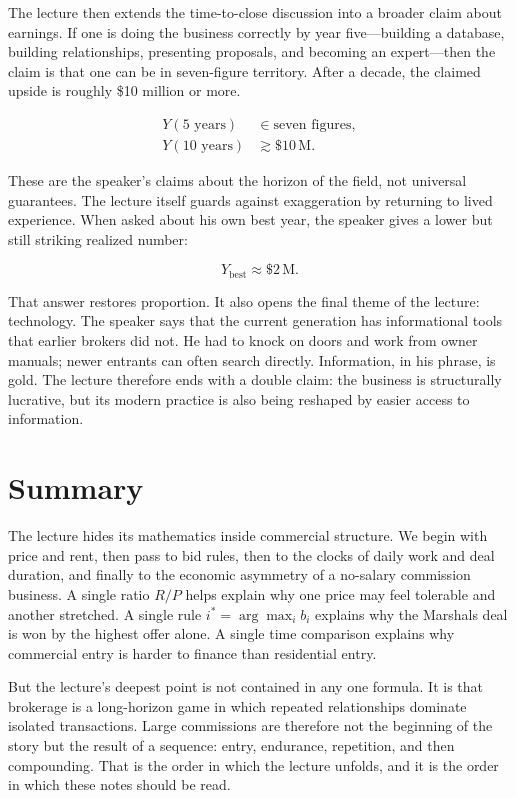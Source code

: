 The lecture then extends the time-to-close discussion into a broader claim about earnings. If one is doing the business correctly by year five---building a database, building relationships, presenting proposals, and becoming an expert---then the claim is that one can be in seven-figure territory. After a decade, the claimed upside is roughly \$10 million or more.

\begin{align}
Y(5\text{ years}) &\in \text{seven figures}, \\
Y(10\text{ years}) &\gtrsim \$10\,\text{M}.
\end{align}

These are the speaker's claims about the horizon of the field, not universal guarantees. The lecture itself guards against exaggeration by returning to lived experience. When asked about his own best year, the speaker gives a lower but still striking realized number:

\begin{equation}
Y_{\text{best}} \approx \$2\,\text{M}.
\end{equation}

That answer restores proportion. It also opens the final theme of the lecture: technology. The speaker says that the current generation has informational tools that earlier brokers did not. He had to knock on doors and work from owner manuals; newer entrants can often search directly. Information, in his phrase, is gold. The lecture therefore ends with a double claim: the business is structurally lucrative, but its modern practice is also being reshaped by easier access to information.

\section{Summary}

The lecture hides its mathematics inside commercial structure. We begin with price and rent, then pass to bid rules, then to the clocks of daily work and deal duration, and finally to the economic asymmetry of a no-salary commission business. A single ratio \(R/P\) helps explain why one price may feel tolerable and another stretched. A single rule \(i^{\ast}=\arg\max_i b_i\) explains why the Marshals deal is won by the highest offer alone. A single time comparison explains why commercial entry is harder to finance than residential entry.

But the lecture's deepest point is not contained in any one formula. It is that brokerage is a long-horizon game in which repeated relationships dominate isolated transactions. Large commissions are therefore not the beginning of the story but the result of a sequence: entry, endurance, repetition, and then compounding. That is the order in which the lecture unfolds, and it is the order in which these notes should be read.